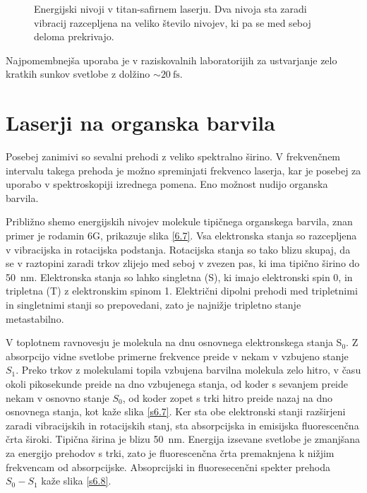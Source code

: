\begin{figure}[h]
\centering
\def\svgwidth{90truemm} 

\caption{Energijski nivoji v titan-safirnem laserju. Dva nivoja sta zaradi vibracij
razcepljena na veliko število nivojev, ki pa se med seboj deloma prekrivajo.
}
\label{fig:TiE}
\end{figure} 

Najpomembnejša uporaba je v raziskovalnih laboratorijih za ustvarjanje zelo kratkih sunkov svetlobe
z dolžino $\sim 20~\si{\femto\second}$.

\section{Laserji na organska barvila}

Posebej zanimivi so sevalni prehodi z veliko spektralno širino. V
frekvenčnem intervalu takega prehoda je možno spreminjati frekvenco
laserja, kar je posebej za uporabo v spektroskopiji izrednega pomena. Eno
možnost nudijo organska barvila.

Približno shemo energijskih nivojev molekule tipičnega organskega barvila,
znan primer je rodamin 6G, prikazuje slika \ref{6.7}. Vsa elektronska stanja
so razcepljena v vibracijska in rotacijska podstanja. Rotacijska stanja so
tako blizu skupaj, da se v raztopini zaradi trkov zlijejo med seboj v zvezen
pas, ki ima tipično širino do 50~nm. Elektronska stanja so lahko singletna
(S), ki imajo elektronski spin 0, in tripletna (T) z elektronskim spinom 1.
Električni dipolni prehodi med tripletnimi in singletnimi stanji so
prepovedani, zato je najnižje tripletno stanje metastabilno.

V toplotnem ravnovesju je molekula na dnu osnovnega elektronskega stanja S$_0
$. Z absorpcijo vidne svetlobe primerne frekvence preide v nekam v vzbujeno
stanje $S_1$. Preko trkov z molekulami topila vzbujena barvilna molekula
zelo hitro, v času okoli pikosekunde preide na dno vzbujenega stanja, od
koder s sevanjem preide nekam v osnovno stanje $S_0$, od koder zopet s trki
hitro preide nazaj na dno osnovnega stanja, kot kaže slika \ref{s6.7}. Ker
sta obe elektronski stanji razširjeni zaradi vibracijskih in rotacijskih
stanj, sta absorpcijska in emisijska fluorescenčna črta široki. Tipična
širina je blizu 50~nm. Energija izsevane svetlobe je zmanjšana za energijo
prehodov s trki, zato je fluorescenčna črta premaknjena k nižjim
frekvencam od absorpcijske. Absoprcijski in fluoresecenčni spekter prehoda $%
S_0-S_1$ kaže slika \ref{s6.8}.

